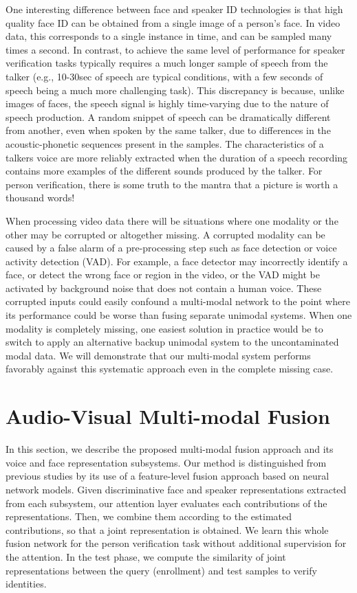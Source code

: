 \documentclass{article}
\begin{document}
One interesting difference between face and speaker ID technologies is that high quality face ID can be obtained from a single image of a person's face.  In video data, this corresponds to a single instance in time, and can be sampled many times a second.  In contrast, to achieve the same level of performance for speaker verification tasks typically requires a much longer sample of speech from the talker (e.g., 10-30sec of speech are typical conditions, with a few seconds of speech being a much more challenging task).  This discrepancy is because, unlike images of faces, the speech signal is highly time-varying due to the nature of speech production.  A random snippet of speech can be dramatically different from another, even when spoken by the same talker, due to differences in the acoustic-phonetic sequences present in the samples.  The characteristics of a talkers voice are more reliably extracted when the duration of a speech recording contains more examples of the different sounds produced by the talker.  For person verification, there is some truth to the mantra that a picture is worth a thousand words!


When processing video data there will be situations where one modality or the other may be corrupted or altogether missing.  A corrupted modality can be caused by a false alarm of a pre-processing step such as face detection or voice activity detection (VAD).  For example, a face detector may incorrectly identify a face, or detect the wrong face or region in the video, or the VAD might be activated by background noise that does not contain a human voice. These corrupted inputs could easily confound a multi-modal network to the point where its performance could be worse than fusing separate unimodal systems.  
When one modality is completely missing, 
one easiest solution in practice would be to switch to apply an alternative backup unimodal system to the uncontaminated modal data.
We will demonstrate that our multi-modal system performs favorably against this systematic approach even in the complete missing case.

\section{Audio-Visual Multi-modal Fusion}
In this section, we describe the proposed multi-modal fusion approach and its voice and face representation subsystems.
Our method is distinguished from previous studies by its use of a feature-level fusion approach based on neural network models. 
Given discriminative face and speaker representations extracted from each subsystem, our attention layer evaluates each contributions of the  representations.
Then, we combine them according to the estimated contributions, so that a joint representation is obtained.
We learn this whole fusion network for the person verification task without additional supervision for the attention.
In the test phase, we compute the similarity of joint representations between the query (enrollment) and test samples to verify identities.
\end{document}
